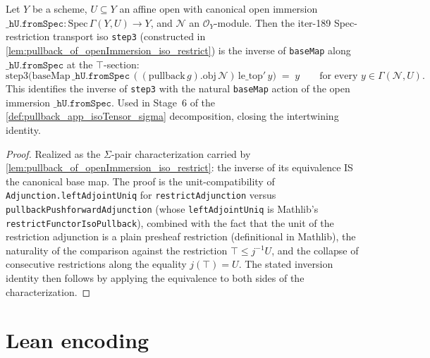 \begin{lemma}
  \label{lem:baseMap_inv_step3_open_immersion}
  \leanok
  Let \(Y\) be a scheme, \(U \subseteq Y\) an affine open with
  canonical open immersion
  \(\mathtt{\_hU.fromSpec} : \text{Spec}\,\Gamma(Y, U) \to Y\), and
  \(\mathcal N\) an \(\mathcal O_Y\)-module. Then the iter-189
  Spec-restriction transport iso \texttt{step3} (constructed in
  \cref{lem:pullback_of_openImmersion_iso_restrict}) is the inverse
  of \texttt{baseMap} along \(\mathtt{\_hU.fromSpec}\) at the
  \(\top\)-section:
  \[
    \text{step3}\bigl(
      \text{baseMap}\,\mathtt{\_hU.fromSpec}\,
        ((\text{pullback}\,g).\mathrm{obj}\,\mathcal N)\,
        \text{le\_top}'\,y
    \bigr) \;=\; y
    \qquad\text{for every } y \in \Gamma(\mathcal N, U).
  \]
  This identifies the inverse of \texttt{step3} with the natural
  \texttt{baseMap} action of the open immersion
  \(\mathtt{\_hU.fromSpec}\). Used in Stage~6 of the
  \cref{def:pullback_app_isoTensor_sigma} decomposition, closing the
  intertwining identity.
\end{lemma}
\begin{proof}
  \leanok
  Realized as the \(\Sigma\)-pair characterization carried by
  \cref{lem:pullback_of_openImmersion_iso_restrict}: the inverse of
  its equivalence IS the canonical base map. The proof is the
  unit-compatibility of \texttt{Adjunction.leftAdjointUniq} for
  \texttt{restrictAdjunction} versus
  \texttt{pullbackPushforwardAdjunction} (whose
  \texttt{leftAdjointUniq} is Mathlib's
  \texttt{restrictFunctorIsoPullback}), combined with the fact that
  the unit of the restriction adjunction is a plain presheaf
  restriction (definitional in Mathlib), the naturality of the
  comparison against the restriction
  \(\top \le j^{-1}U\), and the collapse of consecutive
  restrictions along the equality \(j(\top) = U\). The stated
  inversion identity then follows by applying the equivalence to both
  sides of the characterization.
\end{proof}

\section{Lean encoding}
\label{sec:quot_lean_encoding}

